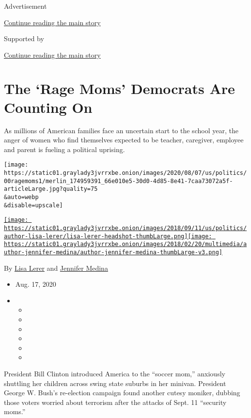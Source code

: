 Advertisement

\protect\hyperlink{after-top}{Continue reading the main story}

Supported by

\protect\hyperlink{after-sponsor}{Continue reading the main story}

\hypertarget{the-rage-moms-democrats-are-counting-on}{%
\section{The `Rage Moms' Democrats Are Counting
On}\label{the-rage-moms-democrats-are-counting-on}}

As millions of American families face an uncertain start to the school
year, the anger of women who find themselves expected to be teacher,
caregiver, employee and parent is fueling a political uprising.

\texttt{[image: https://static01.graylady3jvrrxbe.onion/images/2020/08/07/us/politics/00ragemoms1/merlin\_174959391\_66e010e5-30d0-4d85-8e41-7caa73072a5f-articleLarge.jpg?quality=75\\\&auto=webp\\\&disable=upscale]}

\href{https://www.nytimes3xbfgragh.onion/by/lisa-lerer}{\texttt{[image: https://static01.graylady3jvrrxbe.onion/images/2018/09/11/us/politics/author-lisa-lerer/lisa-lerer-headshot-thumbLarge.png]}}\href{https://www.nytimes3xbfgragh.onion/by/jennifer-medina}{\texttt{[image: https://static01.graylady3jvrrxbe.onion/images/2018/02/20/multimedia/author-jennifer-medina/author-jennifer-medina-thumbLarge-v3.png]}}

By \href{https://www.nytimes3xbfgragh.onion/by/lisa-lerer}{Lisa Lerer}
and
\href{https://www.nytimes3xbfgragh.onion/by/jennifer-medina}{Jennifer
Medina}

\begin{itemize}
\item
  Aug. 17, 2020
\item
  \begin{itemize}
  \item
  \item
  \item
  \item
  \item
  \item
  \end{itemize}
\end{itemize}

President Bill Clinton introduced America to the ``soccer mom,''
anxiously shuttling her children across swing state suburbs in her
minivan. President George W. Bush's re-election campaign found another
cutesy moniker, dubbing those voters worried about terrorism after the
attacks of Sept. 11 ``security moms.''

